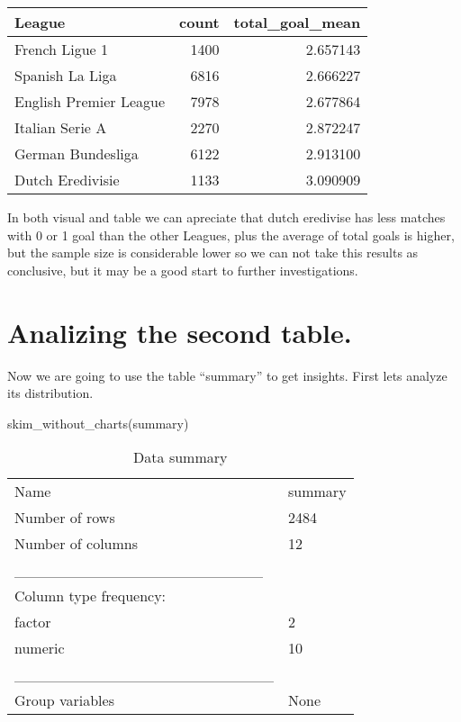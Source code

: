\documentclass[
]{article}
\newenvironment{Shaded}{\begin{snugshade}}{\end{snugshade}}
\newcommand{\FunctionTok}[1]{\textcolor[rgb]{0.00,0.00,0.00}{#1}}
\newcommand{\NormalTok}[1]{#1}
\begin{document}
\begin{longtable}[]{@{}lrr@{}}
\toprule()
League & count & total\_goal\_mean \\
\midrule()
\endhead
French Ligue 1 & 1400 & 2.657143 \\
Spanish La Liga & 6816 & 2.666227 \\
English Premier League & 7978 & 2.677864 \\
Italian Serie A & 2270 & 2.872247 \\
German Bundesliga & 6122 & 2.913100 \\
Dutch Eredivisie & 1133 & 3.090909 \\
\bottomrule()
\end{longtable}

In both visual and table we can apreciate that dutch eredivise has less
matches with 0 or 1 goal than the other Leagues, plus the average of
total goals is higher, but the sample size is considerable lower so we
can not take this results as conclusive, but it may be a good start to
further investigations.

\hypertarget{analizing-the-second-table.}{%
\section{Analizing the second
table.}\label{analizing-the-second-table.}}

Now we are going to use the table ``summary'' to get insights. First
lets analyze its distribution.

\begin{Shaded}
\begin{Highlighting}[]
\FunctionTok{skim\_without\_charts}\NormalTok{(summary)}
\end{Highlighting}
\end{Shaded}

\begin{longtable}[]{@{}ll@{}}
\caption{Data summary}\tabularnewline
\toprule()
\endhead
Name & summary \\
Number of rows & 2484 \\
Number of columns & 12 \\
\_\_\_\_\_\_\_\_\_\_\_\_\_\_\_\_\_\_\_\_\_\_\_ & \\
Column type frequency: & \\
factor & 2 \\
numeric & 10 \\
\_\_\_\_\_\_\_\_\_\_\_\_\_\_\_\_\_\_\_\_\_\_\_\_ & \\
Group variables & None \\
\bottomrule()
\end{longtable}
\end{document}
